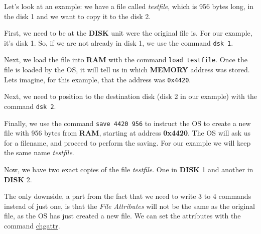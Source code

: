     Let's look at an example: we have a file called \textit{testfile}, which is
    956 bytes long, in the disk 1 and we want to copy it to the disk 2.

    First, we need to be at the \textbf{DISK} unit were the original file is.
    For our example, it's disk 1. So, if we are not already in disk 1, we use
    the command \texttt{dsk 1}.

    Next, we load the file into \textbf{RAM} with the command
    \texttt{load testfile}. Once the file is loaded by the OS, it will tell us
    in which \textbf{MEMORY} address was stored. Lets imagine, for this example,
    that the address was \texttt{0x4420}.

    Next, we need to position to the destination disk (disk 2 in our example)
    with the command \texttt{dsk 2}.

    Finally, we use the command \texttt{save 4420 956} to instruct the OS to
    create a new file with 956 bytes from \textbf{RAM}, starting at address 
    \textbf{0x4420}. The OS will ask us for a filename, and proceed to perform 
    the saving. For our example we will keep the same name \textit{testfile}.

    Now, we have two exact copies of the file \textit{testfile}. One in
    \textbf{DISK} 1 and another in \textbf{DISK} 2.

    The only downside, a part from the fact that we need to write 3 to 4
    commands instead of just one, is that the \textit{File Attributes} will not
    be the same as the original file, as the OS has just created a new file. We
    can set the attributes with the command \hyperref[cmd:chgattr]{chgattr}.